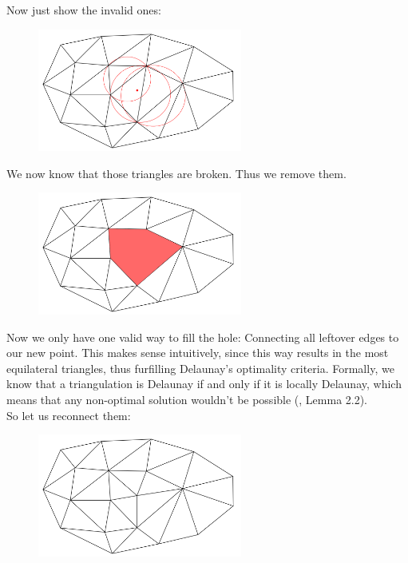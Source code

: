 Now just show the invalid ones:
\begin{figure}[H]
    \centering
    \includegraphics[width=0.6\textwidth]{DelaunayVisualExample04.png}
\end{figure}
We now know that those triangles are broken. Thus we remove them.
\begin{figure}[H]
    \centering
    \includegraphics[width=0.6\textwidth]{DelaunayVisualExample05.png}
\end{figure}
Now we only have one valid way to fill the hole: Connecting all leftover edges to our new point. This makes sense intuitively, since this way results in the most equilateral triangles, thus furfilling Delaunay's optimality criteria. Formally, we know that a triangulation is Delaunay if and only if it is locally Delaunay, which means that any non-optimal solution wouldn't be possible (\cite{FORTUNE1995}, Lemma 2.2).\\
So let us reconnect them:
\begin{figure}[H]
    \centering
    \includegraphics[width=0.6\textwidth]{DelaunayVisualExample06.png}
\end{figure}
